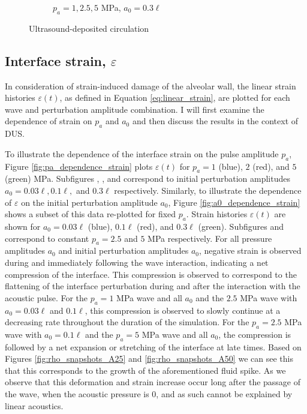 \begin{figure}
\begin{subfigure}[b]{0.49\textwidth}
%
    \caption{\label{fig:us_circulation_pa_dependence} $p_a = 1, 2.5, 5$ MPa, $a_0 = 0.3\ell$}
  \end{subfigure}
  \caption{Ultrasound-deposited circulation}
  \label{fig:us_circulation_history}
\end{figure}
%
\subsection{Interface strain, $\varepsilon$}
In consideration of strain-induced damage of the alveolar wall, the
linear strain histories $\varepsilon(t)$, as defined in Equation
\eqref{eq:linear_strain}, are plotted for each wave and perturbation
amplitude combination. I will first examine the dependence of strain
on $p_a$ and $a_0$ and then discuss the results in the context of
\ac{DUS}.

To illustrate the dependence of the interface strain on the pulse
amplitude $p_a$, Figure \ref{fig:pa_dependence_strain} plots
$\varepsilon(t)$ for $p_a = 1$ (blue), $2$ (red), and $5$ (green)
MPa. Subfigures ,
, and 
correspond to initial perturbation amplitudes
$a_0 = 0.03\ell, 0.1\ell,$ and $0.3\ell$ respectively. Similarly, to
illustrate the dependence of $\varepsilon$ on the initial perturbation
amplitude $a_0$, Figure \ref{fig:a0_dependence_strain} shows a subset
of this data re-plotted for fixed $p_a$. Strain histories
$\varepsilon(t)$ are shown for $a_0 = 0.03\ell$ (blue), $0.1\ell$
(red), and $0.3\ell$ (green). Subfigures
 and 
correspond to constant $p_a = 2.5$ and $5$ MPa respectively. For all
pressure amplitudes $a_0$ and initial perturbation amplitudes $a_0$,
negative strain is observed during and immediately following the wave
interaction, indicating a net compression of the interface. This
compression is observed to correspond to the flattening of the
interface perturbation during and after the interaction with the
acoustic pulse. For the $p_a = 1$ MPa wave and all $a_0$ and the $2.5$
MPa wave with $a_0 = 0.03\ell$ and $0.1\ell$, this compression is
observed to slowly continue at a decreasing rate throughout the
duration of the simulation. For the $p_a = 2.5$ MPa wave with
$a_0 = 0.1\ell$ and the $p_a = 5$ MPa wave and all $a_0$, the
compression is followed by a net expansion or stretching of the
interface at late times. Based on Figures \ref{fig:rho_snapshots_A25}
and \ref{fig:rho_snapshots_A50} we can see this that this corresponds
to the growth of the aforementioned fluid spike. As we observe that
this deformation and strain increase occur long after the passage of
the wave, when the acoustic pressure is $0$, and as such cannot be
explained by linear acoustics.

